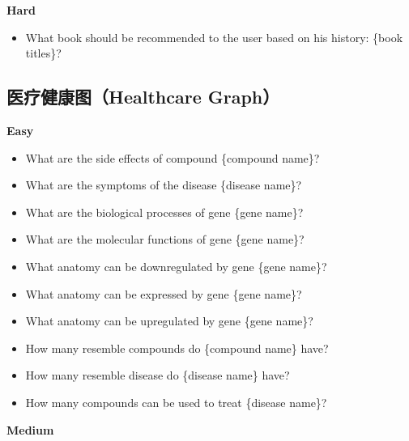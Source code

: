 \documentclass[11pt,UTF8,fontset=fandol]{ctexart}
\begin{document}
\noindent\textbf{Hard}
\begin{itemize}[leftmargin=1.4em,nosep]
\item What book should be recommended to the user based on his history: \{book titles\}?
\end{itemize}

\subsection*{医疗健康图（Healthcare Graph）}
\noindent\textbf{Easy}
\begin{itemize}[leftmargin=1.4em,nosep]
\item What are the side effects of compound \{compound name\}?
\item What are the symptoms of the disease \{disease name\}?
\item What are the biological processes of gene \{gene name\}?
\item What are the molecular functions of gene \{gene name\}?
\item What anatomy can be downregulated by gene \{gene name\}?
\item What anatomy can be expressed by gene \{gene name\}?
\item What anatomy can be upregulated by gene \{gene name\}?
\item How many resemble compounds do \{compound name\} have?
\item How many resemble disease do \{disease name\} have?
\item How many compounds can be used to treat \{disease name\}?
\end{itemize}
\noindent\textbf{Medium}
\end{document}
